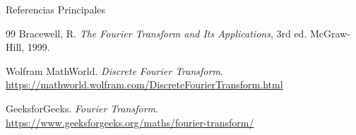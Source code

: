 \documentclass[aspectratio=169]{beamer}
\begin{document}
\begin{frame}{Referencias Principales}
\begin{thebibliography}{99}
Bracewell, R. \textit{The Fourier Transform and Its Applications}, 3rd ed. McGraw-Hill, 1999.

Wolfram MathWorld. \textit{Discrete Fourier Transform}. 
\url{https://mathworld.wolfram.com/DiscreteFourierTransform.html}

GeeksforGeeks. \textit{Fourier Transform}. 
\url{https://www.geeksforgeeks.org/maths/fourier-transform/}
\end{thebibliography}
\end{frame}
\end{document}
